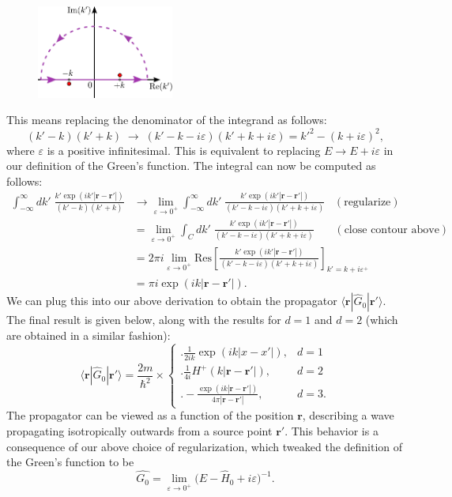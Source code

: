 \documentclass[pra,12pt]{revtex4}
\begin{document}
\begin{figure}[h!]
  \centering\includegraphics[width=0.4\textwidth]{greencontour}
\end{figure}

This means replacing the denominator of the integrand as
follows:
$$(k' - k)(k'+k) \;\rightarrow\; (k' - k - i\varepsilon)(k'+k+i\varepsilon) = {k'}^2 - (k+i\varepsilon)^2,$$
where $\varepsilon$ is a positive infinitesimal.  This is equivalent
to replacing $E \rightarrow E + i\varepsilon$ in our definition of the
Green's function.  The integral can now be computed as
follows:
$$\begin{aligned}\int_{-\infty}^\infty dk' \; \frac{\displaystyle k' \exp\left(ik'|\mathbf{r}-\mathbf{r}'|\right)}{(k' - k)(k'+k)} &\rightarrow \lim_{\varepsilon \rightarrow 0^+} \int_{-\infty}^\infty dk' \; \frac{\displaystyle k' \exp\left(ik'|\mathbf{r}-\mathbf{r}'|\right)}{(k' - k - i\varepsilon)(k'+k+i\varepsilon)}\;\;\; (\text{regularize}) \\ &= \lim_{\varepsilon \rightarrow 0^+} \int_C dk' \; \frac{\displaystyle k' \exp\left(ik'|\mathbf{r}-\mathbf{r}'|\right)}{(k' - k - i\varepsilon)(k'+k+i\varepsilon)} \quad\;\;\; (\text{close contour above}) \\ &= 2\pi i \lim_{\varepsilon \rightarrow 0^+} \mathrm{Res}\left[\frac{\displaystyle k' \exp\left(ik'|\mathbf{r}-\mathbf{r}'|\right)}{(k' - k - i\varepsilon)(k'+k+i\varepsilon)}\right]_{k'=k+i\varepsilon^+} \\ &= \pi i \exp\left(ik|\mathbf{r}-\mathbf{r}'|\right).\end{aligned}$$
We can plug this into our above derivation to obtain the propagator
$\langle\mathbf{r}|\hat{G}_0|\mathbf{r}'\rangle$.  The final result is
given below, along with the results for $d=1$ and $d=2$ (which are
obtained in a similar fashion):
$$\boxed{\;\;\;\langle\mathbf{r}|\hat{G}_0|\mathbf{r}'\rangle = \frac{2m}{\hbar^2} \times \begin{cases} \Bigg.\displaystyle\frac{1}{2ik} \exp\left(ik|x-x'|\right),& d=1\\ \Bigg. \displaystyle\frac{1}{4i} H^+(k|\mathbf{r}-\mathbf{r'}|), & d=2 \\ \displaystyle \Bigg. - \frac{\exp\left(ik|\mathbf{r}-\mathbf{r}'|\right)}{4\pi|\mathbf{r}-\mathbf{r}'|}, & d = 3.  \end{cases}\;\;\;}$$
The propagator can be viewed as a function of the position
$\mathbf{r}$, describing a wave propagating isotropically outwards
from a source point $\mathbf{r}'$.  This behavior is a consequence of
our above choice of regularization, which tweaked the definition of
the Green's function to be
$$\boxed{\quad\hat{G_0} = \lim_{\varepsilon\rightarrow 0^+} \big(E - \hat{H}_0 + i \varepsilon\big)^{-1}.\quad}$$
\end{document}
